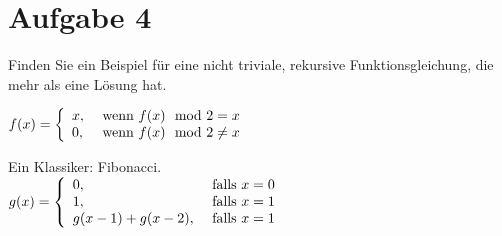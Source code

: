 \documentclass[ngerman,a4paper]{report}
\begin{document}
\section*{Aufgabe 4}
Finden Sie ein Beispiel für eine nicht triviale, rekursive Funktionsgleichung, die mehr als eine Lösung hat.

$f(x) = \left\lbrace\begin{array}{l l}
	x, & \text{ wenn } f(x) \mod 2 = x \\
	0, & \text{ wenn } f(x) \mod 2 \neq x
	\end{array}\right.$


Ein Klassiker: Fibonacci.\\
$g(x) = \left\lbrace\begin{array}{l l}
	0, & \text{ falls } x = 0 \\
	1, & \text{ falls } x = 1 \\
	g(x-1) + g(x-2), & \text{ falls } x = 1 \\
	\end{array}\right.$	
\end{document}
